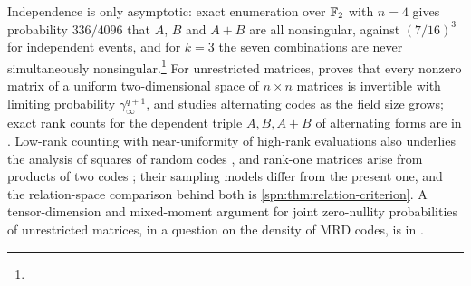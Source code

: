 \begin{remark}\label{spn:rem:hidden-pencil}
Independence is only asymptotic: exact enumeration over $\mathbb{F}_2$ with $n=4$ gives probability
$336/4096$ that $A$, $B$ and $A+B$ are all nonsingular, against $(7/16)^3$ for independent events, and
for $k=3$ the seven combinations are never simultaneously
nonsingular.\footnote{\raggedright{}}
For unrestricted matrices, \cite[Section~6]{Gruica2023Rank} proves that every nonzero matrix of a
uniform two-dimensional space of $n\times n$ matrices is invertible with limiting probability
$\gamma_\infty^{q+1}$, and studies alternating codes as the field size grows; exact rank counts for
the dependent triple $A,B,A+B$ of alternating forms are in \cite{PottSchmidtZhou2016Pairs}. Low-rank
counting with near-uniformity of high-rank evaluations also underlies the analysis of squares of
random codes \cite{Cascudo2015Squares}, and rank-one matrices arise from products of two codes
\cite{Randriambololona2015Linear}; their sampling models differ from the present one, and the
relation-space comparison behind both is \cref{spn:thm:relation-criterion}. A tensor-dimension and
mixed-moment argument for joint zero-nullity probabilities of unrestricted matrices, in a question on
the density of MRD codes, is in \cite{OmegaInstitute2026MRD}.
\end{remark}

